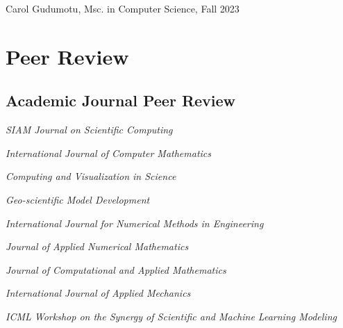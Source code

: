 \documentclass[11pt,letterpaper]{report}
\newcommand{\listitemspace}{0.25em}
\renewenvironment{itemize}
{\begin{list}{}{\setlength{\leftmargin}{0em}
                \setlength{\parskip}{0em}
                \setlength{\itemsep}{\listitemspace}
                \setlength{\parsep}{\listitemspace}}}
{\end{list}}
\begin{document}
    \begin{itemize}

        \item Carol Gudumotu, Msc. in Computer Science, Fall 2023

    \end{itemize}







    \section*{Peer Review}

    \subsection*{Academic Journal Peer Review}


    \begin{itemize}
        \item \textit{SIAM Journal on Scientific Computing  }
        \item \textit{International Journal of Computer Mathematics }
        \item \textit{Computing and Visualization in Science}
        \item \textit{Geo-scientific Model Development }
        \item \textit{International Journal for Numerical Methods in Engineering }
        \item \textit{Journal of Applied Numerical Mathematics }
        \item \textit{Journal of Computational and Applied Mathematics }
        \item \textit{International Journal of Applied Mechanics }
        \item \textit{ICML Workshop on the Synergy of Scientific and Machine Learning Modeling }
    \end{itemize}
        
\end{document}
